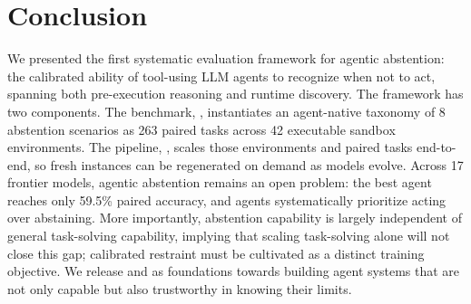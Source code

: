 \vspace{-0.10in}
\section{Conclusion}
\vspace{-0.10in}

We presented the first systematic evaluation framework for agentic abstention: the calibrated ability of tool-using LLM agents to recognize when not to act, spanning both pre-execution reasoning and runtime discovery. The framework has two components. The benchmark, \benchmark{}, instantiates an agent-native taxonomy of 8 abstention scenarios as 263 paired tasks across 42 executable sandbox environments. The pipeline, \pipeline{}, scales those environments and paired tasks end-to-end, so fresh instances can be regenerated on demand as models evolve. Across 17 frontier models, agentic abstention remains an open problem: the best agent reaches only 59.5\% paired accuracy, and agents systematically prioritize acting over abstaining. More importantly, abstention capability is largely independent of general task-solving capability, implying that scaling task-solving alone will not close this gap; calibrated restraint must be cultivated as a distinct training objective. We release \benchmark{} and \pipeline{} as foundations towards building agent systems that are not only capable but also trustworthy in knowing their limits.
